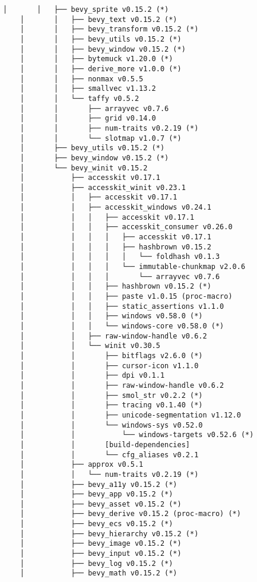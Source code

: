\begin{lstlisting}[style=mystyle, caption={dependencias del proyecto}, label={lst:dependencias}]
    │       │   ├── bevy_sprite v0.15.2 (*)
    │       │   ├── bevy_text v0.15.2 (*)
    │       │   ├── bevy_transform v0.15.2 (*)
    │       │   ├── bevy_utils v0.15.2 (*)
    │       │   ├── bevy_window v0.15.2 (*)
    │       │   ├── bytemuck v1.20.0 (*)
    │       │   ├── derive_more v1.0.0 (*)
    │       │   ├── nonmax v0.5.5
    │       │   ├── smallvec v1.13.2
    │       │   └── taffy v0.5.2
    │       │       ├── arrayvec v0.7.6
    │       │       ├── grid v0.14.0
    │       │       ├── num-traits v0.2.19 (*)
    │       │       └── slotmap v1.0.7 (*)
    │       ├── bevy_utils v0.15.2 (*)
    │       ├── bevy_window v0.15.2 (*)
    │       └── bevy_winit v0.15.2
    │           ├── accesskit v0.17.1
    │           ├── accesskit_winit v0.23.1
    │           │   ├── accesskit v0.17.1
    │           │   ├── accesskit_windows v0.24.1
    │           │   │   ├── accesskit v0.17.1
    │           │   │   ├── accesskit_consumer v0.26.0
    │           │   │   │   ├── accesskit v0.17.1
    │           │   │   │   ├── hashbrown v0.15.2
    │           │   │   │   │   └── foldhash v0.1.3
    │           │   │   │   └── immutable-chunkmap v2.0.6
    │           │   │   │       └── arrayvec v0.7.6
    │           │   │   ├── hashbrown v0.15.2 (*)
    │           │   │   ├── paste v1.0.15 (proc-macro)
    │           │   │   ├── static_assertions v1.1.0
    │           │   │   ├── windows v0.58.0 (*)
    │           │   │   └── windows-core v0.58.0 (*)
    │           │   ├── raw-window-handle v0.6.2
    │           │   └── winit v0.30.5
    │           │       ├── bitflags v2.6.0 (*)
    │           │       ├── cursor-icon v1.1.0
    │           │       ├── dpi v0.1.1
    │           │       ├── raw-window-handle v0.6.2
    │           │       ├── smol_str v0.2.2 (*)
    │           │       ├── tracing v0.1.40 (*)
    │           │       ├── unicode-segmentation v1.12.0
    │           │       └── windows-sys v0.52.0
    │           │           └── windows-targets v0.52.6 (*)
    │           │       [build-dependencies]
    │           │       └── cfg_aliases v0.2.1
    │           ├── approx v0.5.1
    │           │   └── num-traits v0.2.19 (*)
    │           ├── bevy_a11y v0.15.2 (*)
    │           ├── bevy_app v0.15.2 (*)
    │           ├── bevy_asset v0.15.2 (*)
    │           ├── bevy_derive v0.15.2 (proc-macro) (*)
    │           ├── bevy_ecs v0.15.2 (*)
    │           ├── bevy_hierarchy v0.15.2 (*)
    │           ├── bevy_image v0.15.2 (*)
    │           ├── bevy_input v0.15.2 (*)
    │           ├── bevy_log v0.15.2 (*)
    │           ├── bevy_math v0.15.2 (*)

\end{lstlisting}
